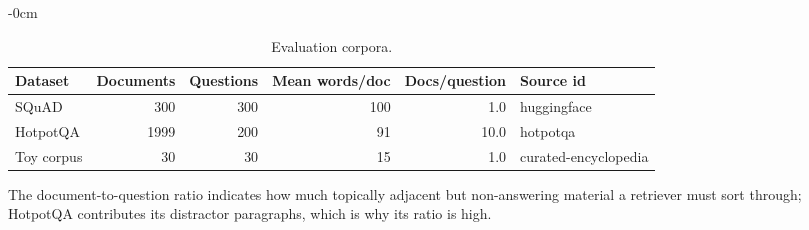 \begin{table}[t]
\begin{adjustwidth}{-\extralength}{0cm}
\centering
\footnotesize
\setlength{\tabcolsep}{3pt}
\caption{Evaluation corpora.\label{tab:datasets}}
\begin{tabular}{lrrrrl}
\toprule
\textbf{Dataset} & \textbf{Documents} & \textbf{Questions} & \textbf{Mean words/doc} & \textbf{Docs/question} & \textbf{Source id}\\
\midrule
SQuAD & 300 & 300 & 100 & 1.0 & huggingface\\
HotpotQA & 1999 & 200 & 91 & 10.0 & hotpotqa\\
Toy corpus & 30 & 30 & 15 & 1.0 & curated-encyclopedia\\
\bottomrule
\end{tabular}
\par\vspace{3pt}
\noindent\parbox{\linewidth}{\footnotesize The document-to-question ratio indicates how much topically adjacent but non-answering material a retriever must sort through; HotpotQA contributes its distractor paragraphs, which is why its ratio is high.}
\end{adjustwidth}
\end{table}
